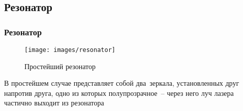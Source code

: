 \documentclass[10pt,pdf,hyperref={unicode}, dvipsnames]{beamer}
\newcommand\frametitless[1]{\subsection{#1}\frametitle{#1}}
\begin{document}
\begin{frame}[t]
	\frametitless{Резонатор}

	\vfill
	\begin{figure}[h]
		\centering
		\texttt{[image: images/resonator]}
		\caption{Простейший резонатор}
	\end{figure}	
	\vfill 
	В простейшем случае представляет собой два зеркала, установленных друг напротив друга, одно из которых полупрозрачное -- через него луч лазера частично выходит из резонатора
\end{frame}



\end{document}

